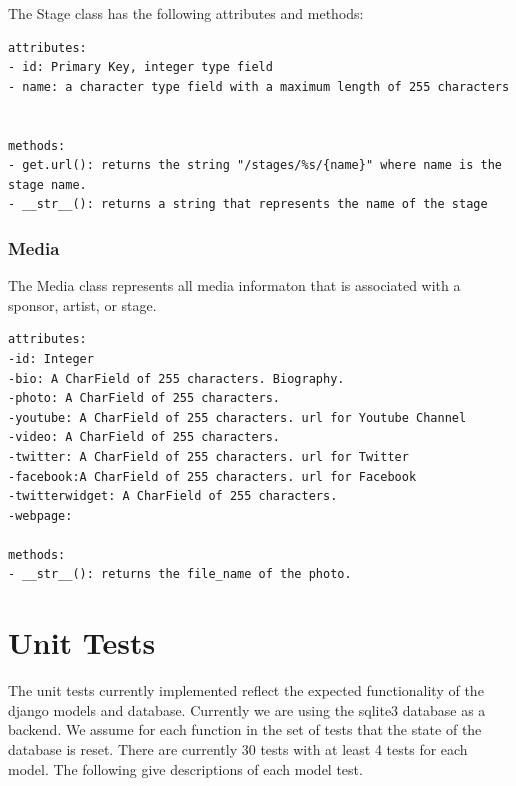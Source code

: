 \documentclass[12pt,english]{scrartcl}
\begin{document}
The Stage class has the following attributes and methods:
\begin{verbatim}
attributes:
- id: Primary Key, integer type field
- name: a character type field with a maximum length of 255 characters


methods:
- get.url(): returns the string "/stages/%s/{name}" where name is the stage name.
- __str__(): returns a string that represents the name of the stage
\end{verbatim}

\subsubsection{Media}
The Media class represents all media informaton that is associated with a sponsor, artist, or stage. 

\begin{verbatim}
attributes:
-id: Integer
-bio: A CharField of 255 characters. Biography. 
-photo: A CharField of 255 characters.
-youtube: A CharField of 255 characters. url for Youtube Channel
-video: A CharField of 255 characters.
-twitter: A CharField of 255 characters. url for Twitter
-facebook:A CharField of 255 characters. url for Facebook
-twitterwidget: A CharField of 255 characters.
-webpage: 

methods:
- __str__(): returns the file_name of the photo.
\end{verbatim}

\section{Unit Tests}
The unit tests currently implemented reflect the expected functionality of the django models and database.
Currently we are using the sqlite3 database as a backend. We assume for each function in the set of tests that the state of the database is reset.
There are currently 30 tests with at least 4 tests for each model. The following give descriptions of each model test. 
\end{document}
